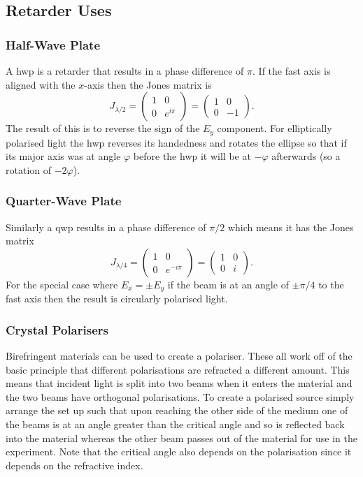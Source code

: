     \subsection{Retarder Uses}
    \subsubsection{Half-Wave Plate}
    A \gls{hwp} is a retarder that results in a phase difference of \(\pi\).
    If the fast axis is aligned with the \(x\)-axis then the Jones matrix is
    \[
        J_{\lambda/2} = 
        \begin{pmatrix}
            1 & 0\\
            0 & e^{i\pi}
        \end{pmatrix}
        =
        \begin{pmatrix}
            1 & 0\\
            0 & -1
        \end{pmatrix}
        .
    \]
    The result of this is to reverse the sign of the \(E_y\) component.
    For elliptically polarised light the \gls{hwp} reverses its handedness and rotates the ellipse so that if its major axis was at angle \(\varphi\) before the \gls{hwp} it will be at \(-\varphi\) afterwards (so a rotation of \(-2\varphi\)).
    
    \subsubsection{Quarter-Wave Plate}
    Similarly a \gls{qwp} results in a phase difference of \(\pi/2\) which means it has the Jones matrix
    \[
        J_{\lambda/4} =
        \begin{pmatrix}
            1 & 0\\
            0 & e^{-i\pi}
        \end{pmatrix}
        =
        \begin{pmatrix}
            1 & 0\\
            0 & i
        \end{pmatrix}
        .
    \]
    For the special case where \(E_x = \pm E_y\) if the beam is at an angle of \(\pm \pi/4\) to the fast axis then the result is circularly polarised light.
    
    \subsubsection{Crystal Polarisers}
    Birefringent materials can be used to create a polariser.
    These all work off of the basic principle that different polarisations are refracted a different amount.
    This means that incident light is split into two beams when it enters the material and the two beams have orthogonal polarisations.
    To create a polarised source simply arrange the set up such that upon reaching the other side of the medium one of the beams is at an angle greater than the critical angle and so is reflected back into the material whereas the other beam passes out of the material for use in the experiment.
    Note that the critical angle also depends on the polarisation since it depends on the refractive index.
    
